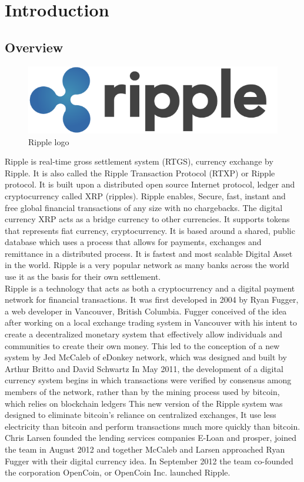 \chapter{Introduction}

\section{Overview}
\begin{figure}[H] 
	\centering \includegraphics[scale=0.31]{images/ripple.png}
	\caption{Ripple logo}
	\label{fig:ripplelogo}
\end{figure}
\noindent Ripple is real-time gross settlement system (RTGS), currency exchange by Ripple. It is also called the Ripple Transaction Protocol (RTXP) or Ripple protocol. It is built upon a distributed open source Internet protocol, ledger and  cryptocurrency called XRP (ripples). Ripple enables, Secure, fast, instant and free global financial transactions of any size with no chargebacks. The digital currency XRP acts as a bridge currency to other currencies. It supports tokens that represents fiat currency, cryptocurrency. It is based around a shared, public database which uses a process that allows for payments, exchanges and remittance in a distributed process. It is fastest and most scalable Digital Asset in the world. Ripple is a very popular network as many banks across the world use it as the basis for their own settlement. \\

\noindent Ripple is a technology that acts as both a cryptocurrency and a digital payment network for financial transactions. It was first developed in 2004 by Ryan Fugger, a  web developer in Vancouver, British Columbia. Fugger conceived of the idea after working on a local exchange trading system in Vancouver with his intent to create a decentralized monetary system that effectively allow individuals and communities to create their own money. This led to the conception of a new system by Jed McCaleb of eDonkey network, which was designed and built by Arthur Britto and David Schwartz In May 2011, the development of a digital currency system begins in which transactions were verified by consensus among members of the network, rather than by the mining process used by bitcoin, which relies on blockchain ledgers This new version of the Ripple system was designed to eliminate bitcoin's reliance on centralized exchanges, It use less electricity than bitcoin and perform transactions much more quickly than bitcoin. Chris Larsen founded the lending services companies E-Loan and prosper, joined the team in August 2012  and together McCaleb and Larsen approached Ryan Fugger with their digital currency idea. In September 2012 the team co-founded the corporation OpenCoin, or OpenCoin Inc. launched Ripple. \\ 


